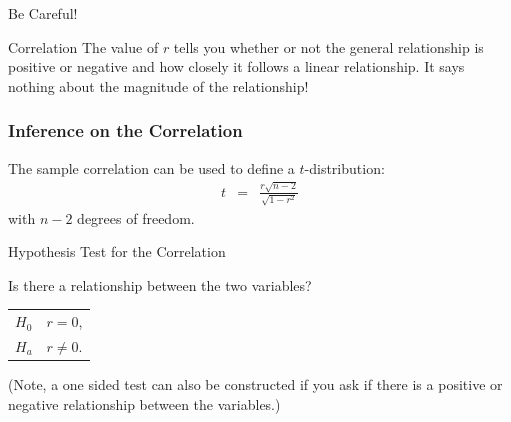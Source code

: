 \begin{frame}{Be Careful!}

  \begin{block}{Correlation}
    The value of $r$ tells you whether or not the general relationship
    is positive or negative and how closely it follows a linear
    relationship. It says nothing about the magnitude of the relationship!
  \end{block}
  
\end{frame}

\begin{frame}
  \frametitle{Inference on the Correlation}

  \begin{definition}
    The sample correlation can be used to define a $t$-distribution:
    \begin{eqnarray*}
      t & = & \frac{r\sqrt{n-2}}{\sqrt{1-r^2}}
    \end{eqnarray*}
    with $n-2$ degrees of freedom.
  \end{definition}

\end{frame}

\begin{frame}{Hypothesis Test for the Correlation}

  Is there a relationship between the two variables? \\
  \begin{tabular}{ll}
    $H_0$ & $r=0$, \\
    $H_a$ & $r\neq 0$.
  \end{tabular}

  (Note, a one sided test can also be constructed if you ask if there
  is a positive or negative relationship between the variables.)

  
\end{frame}


